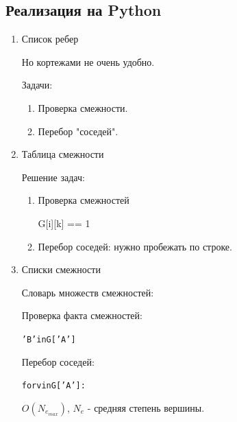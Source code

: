 \subsection{Реализация на Python}
\begin{enumerate}
	\item Список ребер
Но кортежами не очень удобно.

Задачи:
\begin{enumerate}
\item Проверка смежности.
\item Перебор "соседей".
\end{enumerate}

\item Таблица смежности
Решение задач:
\begin{enumerate}
\item Проверка смежностей
\begin{infa}{}
G[i][k] == 1
\end{infa}

\item Перебор соседей: нужно пробежать по строке.
\end{enumerate}

\item Списки смежности

Словарь множеств смежностей:
Проверка факта смежностей:
\begin{alltt}
	'B' in G['A'] 
\end{alltt}

Перебор соседей:
\begin{alltt}
for v in G['A']:
\end{alltt}
$O(N_{e_{max}})$, $N_e$ - средняя степень вершины.

\end{enumerate}